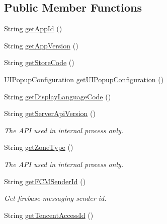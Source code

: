 \subsection*{Public Member Functions}
\begin{DoxyCompactItemize}
\item 
String \hyperlink{classcom_1_1toast_1_1android_1_1gamebase_1_1_gamebase_configuration_a240d4abd81a68efe7d3b9e10537763f5}{get\+App\+Id} ()
\item 
String \hyperlink{classcom_1_1toast_1_1android_1_1gamebase_1_1_gamebase_configuration_a5344eff846b91c2a48847886ee73800f}{get\+App\+Version} ()
\item 
String \hyperlink{classcom_1_1toast_1_1android_1_1gamebase_1_1_gamebase_configuration_ac53dc9a5d7c5e8a4aa816b4476a8c93f}{get\+Store\+Code} ()
\item 
U\+I\+Popup\+Configuration \hyperlink{classcom_1_1toast_1_1android_1_1gamebase_1_1_gamebase_configuration_a4d2e405317c20f14c144b6748a6e998a}{get\+U\+I\+Popup\+Configuration} ()
\item 
String \hyperlink{classcom_1_1toast_1_1android_1_1gamebase_1_1_gamebase_configuration_a2cbab9a001e124c2ad4b9815db0f3012}{get\+Display\+Language\+Code} ()
\item 
String \hyperlink{classcom_1_1toast_1_1android_1_1gamebase_1_1_gamebase_configuration_af74623fc60ebad6b08ba78668d4961cc}{get\+Server\+Api\+Version} ()
\begin{DoxyCompactList}\small\item\em The A\+PI used in internal process only. \end{DoxyCompactList}\item 
String \hyperlink{classcom_1_1toast_1_1android_1_1gamebase_1_1_gamebase_configuration_ae87f638a781db3f92a0bbe89bd3a611f}{get\+Zone\+Type} ()
\begin{DoxyCompactList}\small\item\em The A\+PI used in internal process only. \end{DoxyCompactList}\item 
String \hyperlink{classcom_1_1toast_1_1android_1_1gamebase_1_1_gamebase_configuration_a16a632ddb686090e7c21ecdc727414eb}{get\+F\+C\+M\+Sender\+Id} ()
\begin{DoxyCompactList}\small\item\em Get firebase-\/messaging sender id. \end{DoxyCompactList}\item 
String \hyperlink{classcom_1_1toast_1_1android_1_1gamebase_1_1_gamebase_configuration_ad3bd019dea776f3b49d1f7f3e0fe2157}{get\+Tencent\+Access\+Id} ()

\end{DoxyCompactItemize}

